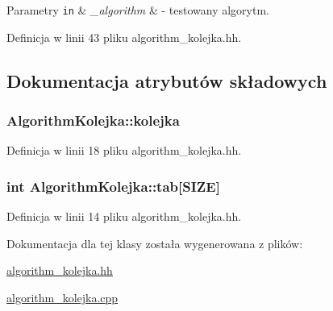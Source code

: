 \begin{DoxyParams}[1]{Parametry}
\mbox{\tt in}  & {\em \-\_\-algorithm} & -\/ testowany algorytm. \\
\hline
\end{DoxyParams}


Definicja w linii 43 pliku algorithm\-\_\-kolejka.\-hh.



\subsection{Dokumentacja atrybutów składowych}
\hypertarget{class_algorithm_kolejka_a49a2b654776c15b98475ce3a7491c3ed}{
\subsubsection[{kolejka}]{ Algorithm\-Kolejka\-::kolejka\hspace{0.3cm}{\ttfamily [private]}}}\label{class_algorithm_kolejka_a49a2b654776c15b98475ce3a7491c3ed}


Definicja w linii 18 pliku algorithm\-\_\-kolejka.\-hh.

\hypertarget{class_algorithm_kolejka_a12512e397f0f154464dc42fb060fdd3e}{
\subsubsection[{tab}]{\setlength{\rightskip}{0pt plus 5cm}int Algorithm\-Kolejka\-::tab\mbox{[}{\bf S\-I\-Z\-E}\mbox{]}\hspace{0.3cm}{\ttfamily [private]}}}\label{class_algorithm_kolejka_a12512e397f0f154464dc42fb060fdd3e}


Definicja w linii 14 pliku algorithm\-\_\-kolejka.\-hh.



Dokumentacja dla tej klasy została wygenerowana z plików\-:\begin{DoxyCompactItemize}
\item 
\hyperlink{algorithm__kolejka_8hh}{algorithm\-\_\-kolejka.\-hh}\item 
\hyperlink{algorithm__kolejka_8cpp}{algorithm\-\_\-kolejka.\-cpp}\end{DoxyCompactItemize}
